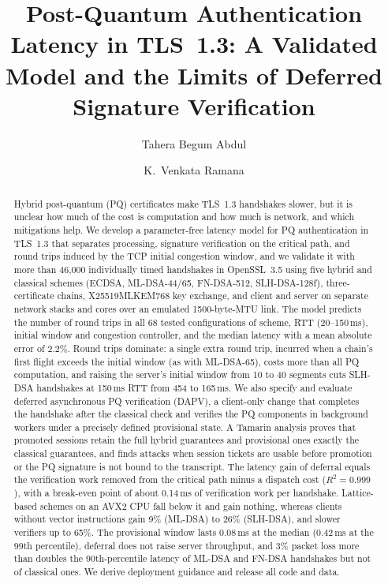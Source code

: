 \documentclass[preprint,10pt,3p]{elsarticle}
\begin{document}
\begin{frontmatter}

\title{Post-Quantum Authentication Latency in TLS~1.3: A Validated Model
and the Limits of Deferred Signature Verification}

\author[au1]{Tahera Begum Abdul}
\author[au1]{K.~Venkata Ramana}
\address[au1]{Department of Computer Science and Systems Engineering,
Andhra University, Visakhapatnam, Andhra Pradesh, India}

\begin{abstract}
Hybrid post-quantum (PQ) certificates make TLS~1.3 handshakes slower, but
it is unclear how much of the cost is computation and how much is
network, and which mitigations help.  We develop a parameter-free latency
model for PQ authentication in TLS~1.3 that separates processing,
signature verification on the critical path, and round trips induced by
the TCP initial congestion window, and we validate it with more than
46{,}000 individually timed handshakes in OpenSSL~3.5 using five hybrid
and classical schemes (ECDSA, ML-DSA-44/65, FN-DSA-512, SLH-DSA-128f),
three-certificate chains, X25519MLKEM768 key exchange, and client and
server on separate network stacks and cores over an emulated
1500-byte-MTU link.  The model predicts the number of round trips in all
68 tested configurations of scheme, RTT (20--150\,ms), initial window and
congestion controller, and the median latency with a mean absolute error
of 2.2\%.  Round trips dominate: a single extra round trip, incurred when a
chain's first flight exceeds the initial window (as with ML-DSA-65), costs
more than all PQ computation, and raising the server's initial window from
10 to 40 segments cuts SLH-DSA handshakes at 150\,ms RTT from 454 to
165\,ms.  We also specify and evaluate deferred asynchronous PQ
verification (DAPV), a client-only change that completes the handshake
after the classical check and verifies the PQ components in background
workers under a precisely defined provisional state.  A Tamarin analysis
proves that promoted sessions retain the full hybrid guarantees and
provisional ones exactly the classical guarantees, and finds attacks when
session tickets are usable before promotion or the PQ signature is not
bound to the transcript.  The latency gain of deferral
equals the verification work removed from the critical path minus a
dispatch cost ($R^2 = 0.999$), with a break-even point of about 0.14\,ms of
verification work per handshake.  Lattice-based schemes on an AVX2 CPU fall
below it and gain nothing, whereas clients without vector instructions
gain 9\% (ML-DSA) to 26\% (SLH-DSA), and slower verifiers up to 65\%.  The
provisional window lasts 0.08\,ms at the median (0.42\,ms at the 99th
percentile), deferral does not raise server throughput, and 3\% packet
loss more than doubles the 90th-percentile latency of ML-DSA and FN-DSA
handshakes but not of classical ones.  We derive deployment guidance and
release all code and data.
\end{abstract}


\end{frontmatter}
\end{document}

